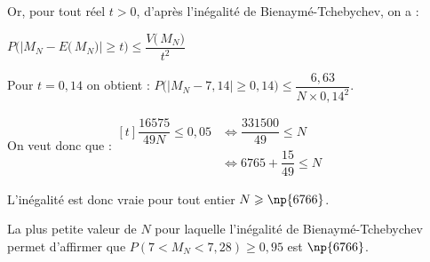 \begin{enumerate}
\begin{enumerate}
Or, pour tout réel $t > 0$, d'après l'inégalité de Bienaymé-Tchebychev, on a :

$P\Big(\big|M_N-E\big(\,M_N\big)\big| \geqslant t\Big) \leqslant \dfrac{V\big(\,M_N\big)}{t^2}$

Pour $t = 0,14$ on obtient : $ P\Big(\big|M_N-7,14\big| \geqslant 0,14\Big)\leqslant \dfrac{6,63}{ N \times 0,14^2}$.

On veut donc que :\quad $\begin{aligned}[t]
	\dfrac{16575}{49 N} \leqslant 0,05 &\iff
	\dfrac{331500}{49} \leqslant N \\
	&\iff 6765+\dfrac{15}{49}\leqslant N
\end{aligned}$

L'inégalité est donc vraie pour tout entier $N \geqslant \np{6766}$.

La plus petite valeur de $N$ pour laquelle l'inégalité de Bienaymé-Tchebychev permet d'affirmer que $P\left(7<M_{N}<7,28\right) \geqslant 0,95$ est $\np{6766}$.

	\end{enumerate}
\end{enumerate}

\bigskip
